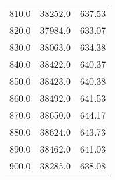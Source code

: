\begin{table}
\begin{tabular}{ccc}
810.0 & 38252.0 & 637.53 \\
820.0 & 37984.0 & 633.07 \\
830.0 & 38063.0 & 634.38 \\
840.0 & 38422.0 & 640.37 \\
850.0 & 38423.0 & 640.38 \\
860.0 & 38492.0 & 641.53 \\
870.0 & 38650.0 & 644.17 \\
880.0 & 38624.0 & 643.73 \\
890.0 & 38462.0 & 641.03 \\
900.0 & 38285.0 & 638.08 \\
\end{tabular}
\end{table}
